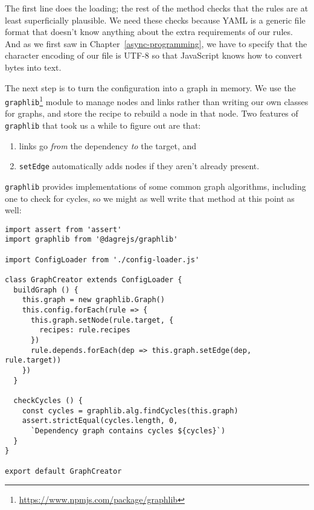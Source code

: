 \documentclass[krantzl]{krantz}
\newcommand{\chapref}[1]{Chapter~\ref{#1}}
\newcommand{\hreffoot}[2]{{#1}\footnote{\href{#2}{#2}}}
\begin{document}
\noindent The first line does the loading;
the rest of the method checks that the rules are at least superficially plausible.
We need these checks because YAML is a generic file format
that doesn’t know anything about the extra requirements of our rules.
And as we first saw in \chapref{async-programming},
we have to specify that the character encoding of our file is UTF-8
so that JavaScript knows how to convert bytes into text.


The next step is to turn the configuration into a graph in memory.
We use the \hreffoot{\texttt{graphlib}}{https://www.npmjs.com/package/graphlib} module to manage nodes and links
rather than writing our own classes for graphs,
and store the recipe to rebuild a node in that node.
Two features of \texttt{graphlib} that took us a while to figure out are that:

\begin{enumerate}

\item 

links go \emph{from} the dependency \emph{to} the target,
    and



\item 

\texttt{setEdge} automatically adds nodes if they aren’t already present.



\end{enumerate}


\noindent \texttt{graphlib} provides implementations of some common graph algorithms,
including one to check for cycles,
so we might as well write that method at this point as well:


\begin{lstlisting}[frame=tblr]
import assert from 'assert'
import graphlib from '@dagrejs/graphlib'

import ConfigLoader from './config-loader.js'

class GraphCreator extends ConfigLoader {
  buildGraph () {
    this.graph = new graphlib.Graph()
    this.config.forEach(rule => {
      this.graph.setNode(rule.target, {
        recipes: rule.recipes
      })
      rule.depends.forEach(dep => this.graph.setEdge(dep, rule.target))
    })
  }

  checkCycles () {
    const cycles = graphlib.alg.findCycles(this.graph)
    assert.strictEqual(cycles.length, 0,
      `Dependency graph contains cycles ${cycles}`)
  }
}

export default GraphCreator
\end{lstlisting}
\end{document}
